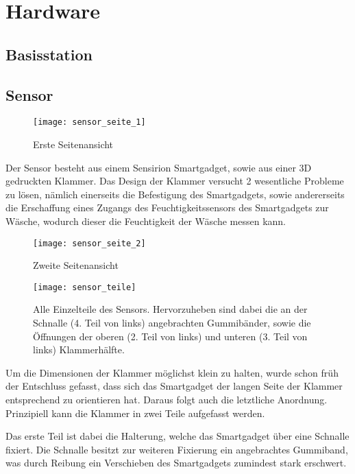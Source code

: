 \section{Hardware}

\subsection{Basisstation}

\newpage
\subsection{Sensor}

\begin{figure}[H] 
	\centerline{\texttt{[image: sensor\_seite\_1]}}
	\caption{Erste Seitenansicht}
	\label{sensor_seite_1}
\end{figure}

Der Sensor besteht aus einem Sensirion Smartgadget, sowie aus einer 3D gedruckten Klammer. Das Design der Klammer versucht 2 wesentliche Probleme zu lösen, nämlich einerseits die Befestigung des Smartgadgets, sowie andererseits die Erschaffung eines Zugangs des Feuchtigkeitssensors des Smartgadgets zur Wäsche, wodurch dieser die Feuchtigkeit der Wäsche messen kann.

\newpage
\begin{figure}[H] 
	\centerline{\texttt{[image: sensor\_seite\_2]}}
	\caption{Zweite Seitenansicht}
	\label{sensor_seite_2}
\end{figure}

\begin{figure}[H] 
	\centerline{\texttt{[image: sensor\_teile]}}
	\caption{Alle Einzelteile des Sensors. Hervorzuheben sind dabei die an der Schnalle (4. Teil von links) angebrachten Gummibänder, sowie die Öffnungen der oberen (2. Teil von links) und unteren (3. Teil von links) Klammerhälfte.}
	\label{sensor_teile}
\end{figure}

Um die Dimensionen der Klammer möglichst klein zu halten, wurde schon früh der Entschluss gefasst, dass sich das Smartgadget der langen Seite der Klammer entsprechend zu orientieren hat. Daraus folgt auch die letztliche Anordnung. Prinzipiell kann die Klammer in zwei Teile aufgefasst werden.

Das erste Teil ist dabei die Halterung, welche das Smartgadget über eine Schnalle fixiert. Die Schnalle besitzt zur weiteren Fixierung ein angebrachtes Gummiband, was durch Reibung ein Verschieben des Smartgadgets zumindest stark erschwert.

